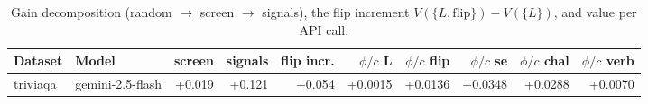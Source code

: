 \begin{table}[t]
\centering
\small
\begin{tabular}{llrrrrrrrr}
\toprule
Dataset & Model & screen & signals & flip incr. & $\phi/c$ L & $\phi/c$ flip & $\phi/c$ se & $\phi/c$ chal & $\phi/c$ verb \\
\midrule
triviaqa & gemini-2.5-flash & +0.019 & +0.121 & +0.054 & +0.0015 & +0.0136 & +0.0348 & +0.0288 & +0.0070 \\
\bottomrule
\end{tabular}
\caption{Gain decomposition (random $\to$ screen $\to$ signals), the flip increment $V(\{L,\mathrm{flip}\})-V(\{L\})$, and value per API call.}
\label{tab:shapley_cost}
\end{table}
